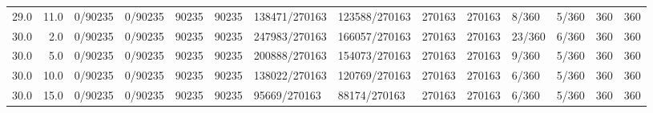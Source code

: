 \begin{tabular}{rrllrrllrrllrr}
29.0 & 11.0 &         0/90235 &    0/90235 &          90235 &      90235 & 138471/270163 & 123588/270163 &         270163 &     270163 &       8/360 &      5/360 &        360 &        360 \\
30.0 &  2.0 &         0/90235 &    0/90235 &          90235 &      90235 & 247983/270163 & 166057/270163 &         270163 &     270163 &      23/360 &      6/360 &        360 &        360 \\
30.0 &  5.0 &         0/90235 &    0/90235 &          90235 &      90235 & 200888/270163 & 154073/270163 &         270163 &     270163 &       9/360 &      5/360 &        360 &        360 \\
30.0 & 10.0 &         0/90235 &    0/90235 &          90235 &      90235 & 138022/270163 & 120769/270163 &         270163 &     270163 &       6/360 &      5/360 &        360 &        360 \\
30.0 & 15.0 &         0/90235 &    0/90235 &          90235 &      90235 &  95669/270163 &  88174/270163 &         270163 &     270163 &       6/360 &      5/360 &        360 &        360 \\
\bottomrule
\end{tabular}
